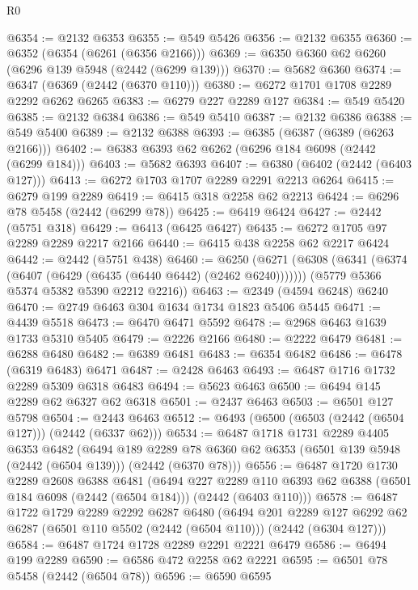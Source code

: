 \begin{lexlean}{R0}
\begin{coremodule}
@6354 := @2132 @6353
@6355 := @549 @5426
@6356 := @2132 @6355
@6360 := @6352 (@6354 (@6261 (@6356 @2166)))
@6369 := @6350 @6360 @62 @6260 (@6296 @139 @5948 (@2442 (@6299 @139)))
@6370 := @5682 @6360
@6374 := @6347 (@6369 (@2442 (@6370 @110)))
@6380 := @6272 @1701 @1708 @2289 @2292 @6262 @6265
@6383 := @6279 @227 @2289 @127
@6384 := @549 @5420
@6385 := @2132 @6384
@6386 := @549 @5410
@6387 := @2132 @6386
@6388 := @549 @5400
@6389 := @2132 @6388
@6393 := @6385 (@6387 (@6389 (@6263 @2166)))
@6402 := @6383 @6393 @62 @6262 (@6296 @184 @6098 (@2442 (@6299 @184)))
@6403 := @5682 @6393
@6407 := @6380 (@6402 (@2442 (@6403 @127)))
@6413 := @6272 @1703 @1707 @2289 @2291 @2213 @6264
@6415 := @6279 @199 @2289
@6419 := @6415 @318 @2258 @62 @2213
@6424 := @6296 @78 @5458 (@2442 (@6299 @78))
@6425 := @6419 @6424
@6427 := @2442 (@5751 @318)
@6429 := @6413 (@6425 @6427)
@6435 := @6272 @1705 @97 @2289 @2289 @2217 @2166
@6440 := @6415 @438 @2258 @62 @2217 @6424
@6442 := @2442 (@5751 @438)
@6460 := @6250
    (@6271
      (@6308 (@6341 (@6374 (@6407 (@6429 (@6435 (@6440 @6442) (@2462 @6240)))))))
      (@5779 @5366 @5374 @5382 @5390 @2212 @2216))
@6463 := @2349 (@4594 @6248) @6240
@6470 := @2749 @6463 @304 @1634 @1734 @1823 @5406 @5445
@6471 := @4439 @5518
@6473 := @6470 @6471 @5592
@6478 := @2968 @6463 @1639 @1733 @5310 @5405
@6479 := @2226 @2166
@6480 := @2222 @6479
@6481 := @6288 @6480
@6482 := @6389 @6481
@6483 := @6354 @6482
@6486 := @6478 (@6319 @6483) @6471
@6487 := @2428 @6463
@6493 := @6487 @1716 @1732 @2289 @5309 @6318 @6483
@6494 := @5623 @6463
@6500 := @6494 @145 @2289 @62 @6327 @62 @6318
@6501 := @2437 @6463
@6503 := @6501 @127 @5798
@6504 := @2443 @6463
@6512 := @6493 (@6500 (@6503 (@2442 (@6504 @127))) (@2442 (@6337 @62)))
@6534 := @6487
    @1718
    @1731
    @2289
    @4405
    @6353
    @6482
    (@6494
      @189
      @2289
      @78
      @6360
      @62
      @6353
      (@6501 @139 @5948 (@2442 (@6504 @139)))
      (@2442 (@6370 @78)))
@6556 := @6487
    @1720
    @1730
    @2289
    @2608
    @6388
    @6481
    (@6494
      @227
      @2289
      @110
      @6393
      @62
      @6388
      (@6501 @184 @6098 (@2442 (@6504 @184)))
      (@2442 (@6403 @110)))
@6578 := @6487
    @1722
    @1729
    @2289
    @2292
    @6287
    @6480
    (@6494
      @201
      @2289
      @127
      @6292
      @62
      @6287
      (@6501 @110 @5502 (@2442 (@6504 @110)))
      (@2442 (@6304 @127)))
@6584 := @6487 @1724 @1728 @2289 @2291 @2221 @6479
@6586 := @6494 @199 @2289
@6590 := @6586 @472 @2258 @62 @2221
@6595 := @6501 @78 @5458 (@2442 (@6504 @78))
@6596 := @6590 @6595

\end{coremodule}
\end{lexlean}
